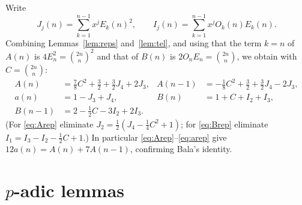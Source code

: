 \documentclass[11pt]{amsart}
\theoremstyle{definition}
\theoremstyle{remark}
\begin{document}
Write
\begin{equation}\label{eq:IJ}
J_j(n)=\sum_{k=1}^{n-1}x^jE_k(n)^2,\qquad I_j(n)=\sum_{k=1}^{n-1}x^jO_k(n)E_k(n).
\end{equation}
Combining Lemmas~\ref{lem:reps} and~\ref{lem:tel}, and using that the term $k=n$ of
$A(n)$ is $4E_n^2=\binom{2n}n^2$ and that of $B(n)$ is $2O_nE_n=\binom{2n}n$, we obtain
with $C=\binom{2n}n$:
\begin{align}
A(n)&=\tfrac78C^2+\tfrac32+\tfrac32J_4+2J_3, &
A(n-1)&=-\tfrac18C^2+\tfrac32+\tfrac32J_4-2J_3, \label{eq:Arep}\\
a(n)&=1-J_3+J_4, &
B(n)&=1+C+I_2+I_3, \label{eq:arep}\\
B(n-1)&=2-\tfrac12C-3I_2+2I_3. \label{eq:Brep}
\end{align}
(For \eqref{eq:Arep} eliminate $J_2=\tfrac12(J_4-\tfrac14C^2+1)$; for \eqref{eq:Brep}
eliminate $I_1=I_3-I_2-\tfrac12C+1$.) In particular \eqref{eq:Arep}--\eqref{eq:arep} give
$12a(n)=A(n)+7A(n-1)$, confirming Bala's identity.

\section{\texorpdfstring{$p$}{p}-adic lemmas}
\end{document}
